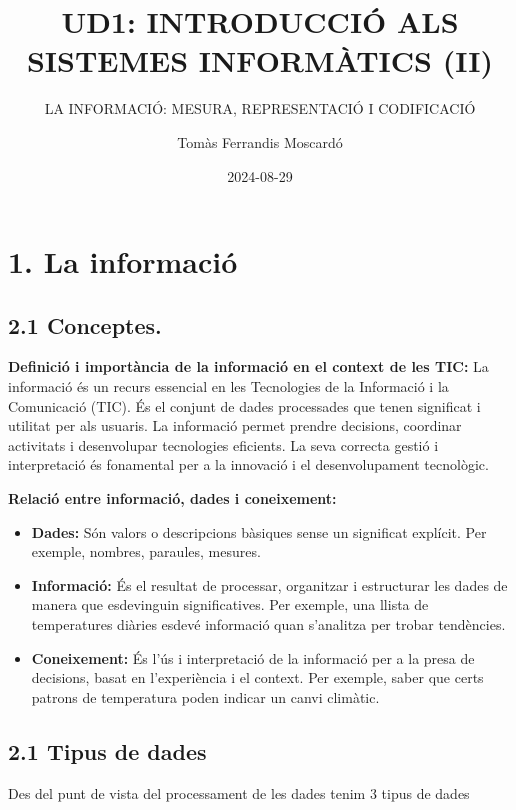\documentclass[
  12 pt,
  a4paper,
]{article}
\title{UD1: INTRODUCCIÓ ALS SISTEMES INFORMÀTICS (II)}
\subtitle{LA INFORMACIÓ: MESURA, REPRESENTACIÓ I CODIFICACIÓ}
\author{Tomàs Ferrandis Moscardó}
\date{2024-08-29}
\begin{document}
\maketitle

{
\setcounter{tocdepth}{2}
\tableofcontents
}
\section{1. La informació}\label{la-informaciuxf3}

\subsection{2.1 Conceptes.}\label{conceptes.}

\textbf{Definició i importància de la informació en el context de les
TIC:} La informació és un recurs essencial en les Tecnologies de la
Informació i la Comunicació (TIC). És el conjunt de dades processades
que tenen significat i utilitat per als usuaris. La informació permet
prendre decisions, coordinar activitats i desenvolupar tecnologies
eficients. La seva correcta gestió i interpretació és fonamental per a
la innovació i el desenvolupament tecnològic.

\textbf{Relació entre informació, dades i coneixement:}

\begin{itemize}
\item
  \textbf{Dades:} Són valors o descripcions bàsiques sense un significat
  explícit. Per exemple, nombres, paraules, mesures.
\item
  \textbf{Informació:} És el resultat de processar, organitzar i
  estructurar les dades de manera que esdevinguin significatives. Per
  exemple, una llista de temperatures diàries esdevé informació quan
  s'analitza per trobar tendències.
\item
  \textbf{Coneixement:} És l'ús i interpretació de la informació per a
  la presa de decisions, basat en l'experiència i el context. Per
  exemple, saber que certs patrons de temperatura poden indicar un canvi
  climàtic.
\end{itemize}

\subsection{2.1 Tipus de dades}\label{tipus-de-dades}

Des del punt de vista del processament de les dades tenim 3 tipus de
dades
\end{document}
